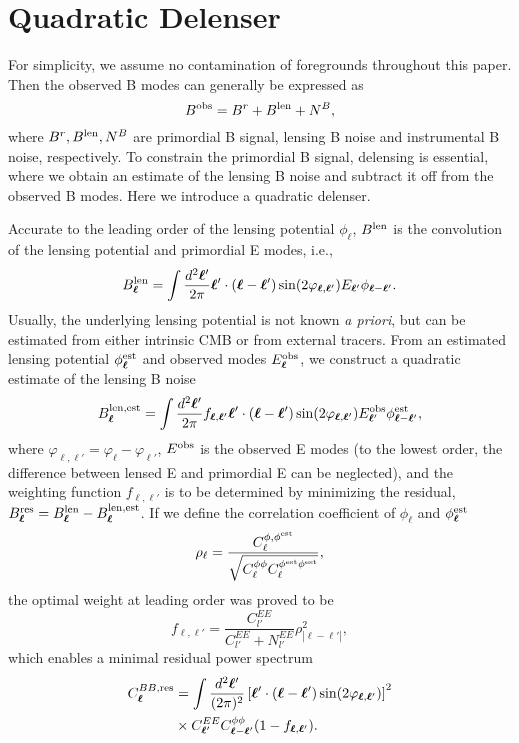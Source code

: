 \documentclass[aps, prd, reprint, nofootinbib, groupedaddress, showpacs]{revtex4-1}
\def\be{\begin{equation}}
\def\ee{\end{equation}}
\newcommand*\Bell{\ensuremath{\boldsymbol\ell}}
\begin{document}
\section{Quadratic Delenser}
\label{sec:delen}
For simplicity, we assume no contamination of foregrounds throughout this paper.
Then the observed B modes can generally be expressed as
\be
B^{\rm obs} = B^{r} + B^{\rm len} + N^B,
\ee
where $B^r, B^{\rm len}, N^B$ are primordial B signal, lensing B noise
and instrumental B noise, respectively. To constrain the primordial B signal,
delensing is essential, where we obtain an estimate of the lensing B noise and subtract it off from the
observed B modes. Here we introduce a quadratic delenser.

Accurate to the leading order of the lensing potential $\phi_{\Bell}$,
$B^{\rm len}$ is the convolution of the lensing potential and primordial E modes, i.e.,
\be
\label{eq:convol}
B^{\rm len}_{\Bell} = \int \frac{d^2\Bell'}{2\pi} \Bell'\cdot(\Bell-\Bell') \sin(2\varphi_{\Bell,\Bell'}) E_{\Bell'}\phi_{\Bell-\Bell'}.
\ee
Usually, the underlying lensing potential is not  known {\it a priori}, but can be estimated from either intrinsic CMB
or from external tracers. From an estimated lensing potential $\phi^{\rm est}_{\Bell}$
and observed modes $E_{\Bell}^{\rm obs}$, we construct a quadratic estimate of the lensing B noise
\be
\label{eq:wconvol}
B^{\rm len, est}_{\Bell} = \int \frac{d^2\Bell'}{2\pi} f_{\Bell,\Bell'} \Bell' \cdot(\Bell-\Bell')\sin(2\varphi_{\Bell,\Bell'})  E^{\rm obs}_{\Bell'} \phi^{\rm est}_{\Bell-\Bell'},
\ee
where $\varphi_{\Bell,\Bell'} = \varphi_{\Bell} - \varphi_{\Bell'}$,
$E^{\rm obs}$ is the observed E modes (to the lowest order, the difference between
lensed E and primordial E can be neglected),
and the weighting function $f_{\Bell,\Bell'}$ is to be determined by minimizing the residual,
$B_{\Bell}^{\rm res} = B^{\rm len}_{\Bell} - B^{\rm len, est}_{\Bell}$.
If we define the correlation coefficient of $\phi_{\Bell}$ and $\phi^{\rm est}_{\Bell}$
\be
\label{eq:corr}
\rho_\ell =  \frac{C_\ell^{\phi, \phi^{\rm est}}}{\sqrt{C_\ell^{\phi\phi} C_\ell^{\phi^{\rm est}\phi^{\rm est}}}},
\ee
the optimal weight at leading order was proved to be \citep{Sherwin2015}
\be
f_{\Bell,\Bell'} = \frac{C_{l'}^{EE}}{C_{l'}^{EE} + N_{l'}^{EE}} \rho_{|\Bell-\Bell'|}^2,
\ee
which enables a minimal residual power spectrum
\be
\label{eq:respower}
\begin{aligned}
C_{\Bell}^{BB, {\rm res}}
& =\int \frac{d^2\Bell'}{(2\pi)^2} \left[\Bell'\cdot(\Bell-\Bell') \sin(2\varphi_{\Bell,\Bell'})  \right]^2\\
&\times C_{\Bell'}^{EE} C^{\phi\phi}_{\Bell-\Bell'} (1-f_{\Bell,\Bell'}).
\end{aligned}
\ee
\end{document}
